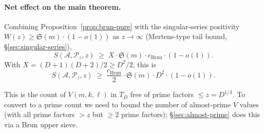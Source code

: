 \paragraph{Net effect on the main theorem.}
Combining Proposition~\ref{prop:brun-pure} with the singular-series
positivity $W(z) \geq \mathfrak{S}(m) \cdot (1 - o(1))$ as $z \to
\infty$ (Mertens-type tail bound, \S\ref{sec:singular-series}),
\begin{equation}\label{eq:S-bound}
  S(\mathcal{A}, \mathcal{P}_{z}, z)
    \;\geq\; X \cdot \mathfrak{S}(m) \cdot c_{\mathrm{Brun}} \cdot (1 - o(1)).
\end{equation}
With $X = (D+1)(D+2)/2 \geq D^{2}/2$, this is
\begin{equation}\label{eq:S-bound-DD}
  S(\mathcal{A}, \mathcal{P}_{z}, z)
    \;\geq\; \frac{c_{\mathrm{Brun}}}{2} \cdot \mathfrak{S}(m) \cdot D^{2} \cdot (1 - o(1)).
\end{equation}

This is the count of $V(m, k, \ell)$ in $T_{D}$ free of prime factors
$\leq z = D^{1/3}$. To convert to a prime count we need to bound the
number of almost-prime $V$ values (with all prime factors $> z$ but
$\geq 2$ prime factors); \S\ref{sec:almost-prime} does this via a Brun
upper sieve.
